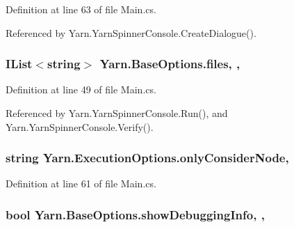 Definition at line 63 of file Main.\-cs.



Referenced by Yarn.\-Yarn\-Spinner\-Console.\-Create\-Dialogue().

\hypertarget{a00041_aa93cbb1bc1d5328e0a417012621e92d2}{
\subsubsection[{files}]{\setlength{\rightskip}{0pt plus 5cm}I\-List$<$string$>$ Yarn.\-Base\-Options.\-files\hspace{0.3cm}{\ttfamily [get]}, {\ttfamily [set]}, {\ttfamily [inherited]}}}\label{a00041_aa93cbb1bc1d5328e0a417012621e92d2}


Definition at line 49 of file Main.\-cs.



Referenced by Yarn.\-Yarn\-Spinner\-Console.\-Run(), and Yarn.\-Yarn\-Spinner\-Console.\-Verify().

\hypertarget{a00103_af4c0062a1d46281d377f87084fde374e}{
\subsubsection[{only\-Consider\-Node}]{\setlength{\rightskip}{0pt plus 5cm}string Yarn.\-Execution\-Options.\-only\-Consider\-Node\hspace{0.3cm}{\ttfamily [get]}, {\ttfamily [set]}}}\label{a00103_af4c0062a1d46281d377f87084fde374e}


Definition at line 61 of file Main.\-cs.

\hypertarget{a00041_a89964ea17bd19caf00cb5bff563ed01c}{
\subsubsection[{show\-Debugging\-Info}]{\setlength{\rightskip}{0pt plus 5cm}bool Yarn.\-Base\-Options.\-show\-Debugging\-Info\hspace{0.3cm}{\ttfamily [get]}, {\ttfamily [set]}, {\ttfamily [inherited]}}}\label{a00041_a89964ea17bd19caf00cb5bff563ed01c}


